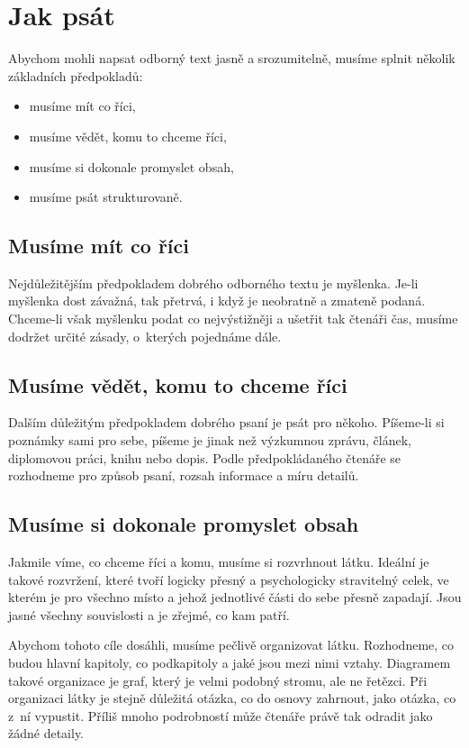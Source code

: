 \documentclass{template/socthesis}
\begin{document}
\newpage

\section{Jak psát}
Abychom mohli napsat odborný text jasně a srozumitelně, musíme splnit několik základních předpokladů\cite{vut-zkousky}:
\begin{itemize}
	\item musíme mít co říci,
	\item musíme vědět, komu to chceme říci,
	\item musíme si dokonale promyslet obsah,
	\item musíme psát strukturovaně.
\end{itemize}

\subsection{Musíme mít co říci}
Nejdůležitějším předpokladem dobrého odborného textu je myšlenka. Je-li myšlenka dost závažná, tak přetrvá, i když je neobratně a zmateně podaná. Chceme-li však myšlenku podat co nejvýstižněji a ušetřit tak čtenáři čas, musíme dodržet určité zásady, o~kterých pojednáme dále.

\subsection{Musíme vědět, komu to chceme říci}
Dalším důležitým předpokladem dobrého psaní je psát pro někoho. Píšeme-li si poznámky sami pro sebe, píšeme je jinak než výzkumnou zprávu, článek, diplomovou práci, knihu nebo dopis. Podle předpokládaného čtenáře se rozhodneme pro způsob psaní, rozsah informace a míru detailů.

\subsection{Musíme si dokonale promyslet obsah}
Jakmile víme, co chceme říci a komu, musíme si rozvrhnout látku. Ideální je takové rozvržení, které tvoří logicky přesný a psychologicky stravitelný celek, ve kterém je pro všechno místo a jehož jednotlivé části do sebe přesně zapadají. Jsou jasné všechny souvislosti a je zřejmé, co kam patří.

Abychom tohoto cíle dosáhli, musíme pečlivě organizovat látku. Rozhodneme, co budou hlavní kapitoly, co podkapitoly a jaké jsou mezi nimi vztahy. Diagramem takové organizace je graf, který je velmi podobný stromu, ale ne řetězci. Při organizaci látky je stejně důležitá otázka, co do osnovy zahrnout, jako otázka, co z~ní vypustit. Příliš mnoho podrobností může čtenáře právě tak odradit jako žádné detaily.
\end{document}
